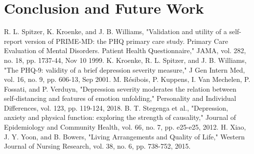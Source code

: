 \documentclass[runningheads]{llncs}
\begin{document}
\section{Conclusion and Future Work}
%
%
%
\begin{thebibliography}{8}
%
	R. L. Spitzer, K. Kroenke, and J. B. Williams, "Validation and utility of a self-report version of PRIME-MD: the PHQ primary care study. Primary Care Evaluation of Mental Disorders. Patient Health Questionnaire," JAMA, vol. 282, no. 18, pp. 1737-44, Nov 10 1999.
%
	K. Kroenke, R. L. Spitzer, and J. B. Williams, "The PHQ-9: validity of a brief depression severity measure," J Gen Intern Med, vol. 16, no. 9, pp. 606-13, Sep 2001.
%
	M. Résibois, P. Kuppens, I. Van Mechelen, P. Fossati, and P. Verduyn, "Depression severity moderates the relation between self-distancing and features of emotion unfolding," Personality and Individual Differences, vol. 123, pp. 119-124, 2018.
%
	B. T. Stegenga et al., "Depression, anxiety and physical function: exploring the strength of causality," Journal of Epidemiology and Community Health, vol. 66, no. 7, pp. e25-e25, 2012.
%
	H. Xiao, J. Y. Yoon, and B. Bowers, "Living Arrangements and Quality of Life," Western Journal of Nursing Research, vol. 38, no. 6, pp. 738-752, 2015.
%
%
%
%
%
%
%
%
%
%
%
%
%
%
%
%
%
%
\end{thebibliography}
\end{document}
